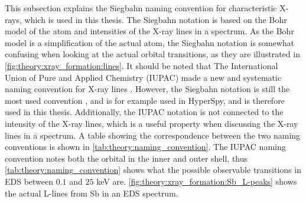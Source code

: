 This subsection explains the Siegbahn naming convention for characteristic X-rays, which is used in this thesis.
The Siegbahn notation is based on the Bohr model of the atom and intensities of the X-ray lines in a spectrum.
As the Bohr model is a simplification of the actual atom, the Siegbahn notation is somewhat confusing when looking at the actual orbital transitions, as they are illustrated in \cref{fig:theory:xray_formation:lines}.
It should be noted that The International Union of Pure and Applied Chemistry (IUPAC) made a new and systematic naming convention for X-ray lines \cite{IUPAC_nomenclature1991}.
However, the Siegbahn notation is still the most used convention \cite[Ch. 4.2.4]{goldstein_scanning_2018}, and is for example used in HyperSpy, and is therefore used in this thesis.
Additionally, the IUPAC notation is not connected to the intensity of the X-ray lines, which is a useful property when discussing the X-ray lines in a spectrum.
A table showing the correspondence between the two naming conventions is shown in \cref{tab:theory:naming_convention}.
The IUPAC naming convention notes both the orbital in the inner and outer shell, thus \cref{tab:theory:naming_convention} shows what the possible observable transitions in EDS between $0.1$ and $25$ keV are.
\cref{fig:theory:xray_formation:Sb_L-peaks} shows the actual L-lines from Sb in an EDS spectrum.




